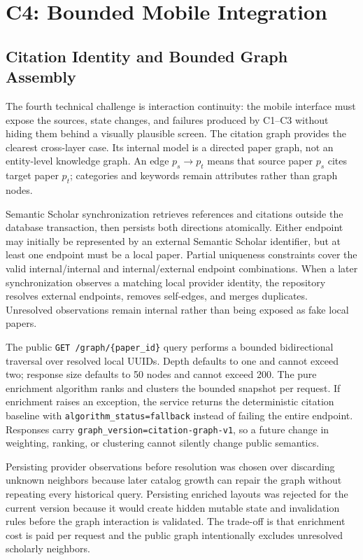 \section{C4: Bounded Mobile Integration}
\label{sec:c4-mobile}

\subsection{Citation Identity and Bounded Graph Assembly}

The fourth technical challenge is interaction continuity: the mobile interface must expose the sources, state changes, and failures produced by C1--C3 without hiding them behind a visually plausible screen. The citation graph provides the clearest cross-layer case. Its internal model is a directed paper graph, not an entity-level knowledge graph. An edge \(p_s\rightarrow p_t\) means that source paper \(p_s\) cites target paper \(p_t\); categories and keywords remain attributes rather than graph nodes.

Semantic Scholar synchronization retrieves references and citations outside the database transaction, then persists both directions atomically. Either endpoint may initially be represented by an external Semantic Scholar identifier, but at least one endpoint must be a local paper. Partial uniqueness constraints cover the valid internal/internal and internal/external endpoint combinations. When a later synchronization observes a matching local provider identity, the repository resolves external endpoints, removes self-edges, and merges duplicates. Unresolved observations remain internal rather than being exposed as fake local papers.

The public \texttt{GET /graph/\{paper\_id\}} query performs a bounded bidirectional traversal over resolved local UUIDs. Depth defaults to one and cannot exceed two; response size defaults to 50 nodes and cannot exceed 200. The pure enrichment algorithm ranks and clusters the bounded snapshot per request. If enrichment raises an exception, the service returns the deterministic citation baseline with \texttt{algorithm\_status=fallback} instead of failing the entire endpoint. Responses carry \texttt{graph\_version=citation-graph-v1}, so a future change in weighting, ranking, or clustering cannot silently change public semantics.

Persisting provider observations before resolution was chosen over discarding unknown neighbors because later catalog growth can repair the graph without repeating every historical query. Persisting enriched layouts was rejected for the current version because it would create hidden mutable state and invalidation rules before the graph interaction is validated. The trade-off is that enrichment cost is paid per request and the public graph intentionally excludes unresolved scholarly neighbors.

